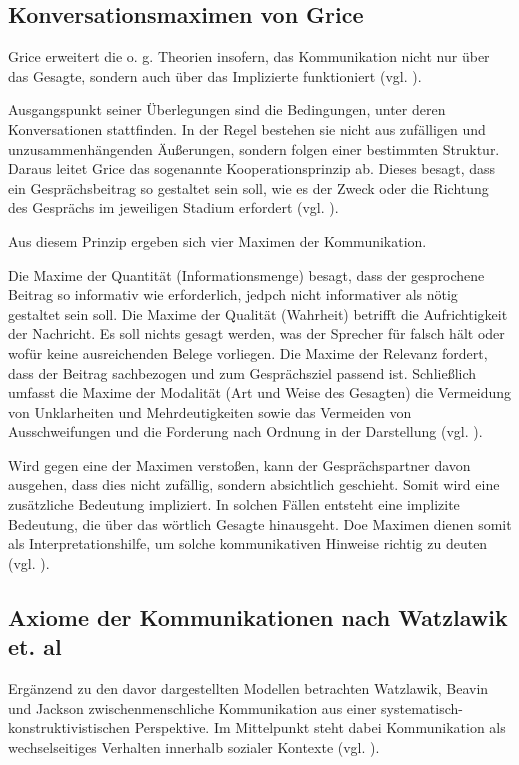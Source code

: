 \subsection{Konversationsmaximen von Grice}
Grice erweitert die o. g. Theorien insofern, das Kommunikation nicht nur über das Gesagte, sondern auch über das Implizierte funktioniert (vgl. \citealp[S. 43f]{grice1975logic}). 

Ausgangspunkt seiner Überlegungen sind die Bedingungen, unter deren Konversationen stattfinden. In der Regel bestehen sie nicht aus zufälligen und unzusammenhängenden Äußerungen, sondern folgen einer bestimmten Struktur. Daraus leitet Grice das sogenannte Kooperationsprinzip ab. Dieses besagt, dass ein Gesprächsbeitrag so gestaltet sein soll, wie es der Zweck oder die Richtung des Gesprächs im jeweiligen Stadium erfordert (vgl. \citealp[S. 45]{grice1975logic}).

Aus diesem Prinzip ergeben sich vier Maximen der Kommunikation. 

Die Maxime der Quantität (Informationsmenge) besagt, dass der gesprochene Beitrag so informativ wie erforderlich, jedpch nicht informativer als nötig gestaltet sein soll. Die Maxime der Qualität (Wahrheit) betrifft die Aufrichtigkeit der Nachricht. Es soll nichts gesagt werden, was der Sprecher für falsch hält oder wofür keine ausreichenden Belege vorliegen. Die Maxime der Relevanz fordert, dass der Beitrag sachbezogen und zum Gesprächsziel passend ist. Schließlich umfasst die Maxime der Modalität (Art und Weise des Gesagten) die Vermeidung von Unklarheiten und Mehrdeutigkeiten sowie das Vermeiden von Ausschweifungen und die Forderung nach Ordnung in der Darstellung (vgl. \citealp[S. 45f]{grice1975logic}).

Wird gegen eine der Maximen verstoßen, kann der Gesprächspartner davon ausgehen, dass dies nicht zufällig, sondern absichtlich geschieht. Somit wird eine zusätzliche Bedeutung impliziert. In solchen Fällen entsteht eine implizite Bedeutung, die über das wörtlich Gesagte hinausgeht. Doe Maximen dienen somit als Interpretationshilfe, um solche kommunikativen Hinweise richtig zu deuten (vgl. \citealp[S. 49f]{grice1975logic}).

\subsection{Axiome der Kommunikationen nach Watzlawik et. al}
Ergänzend zu den davor dargestellten Modellen betrachten Watzlawik, Beavin und Jackson zwischenmenschliche Kommunikation aus einer systematisch-konstruktivistischen Perspektive. Im Mittelpunkt steht dabei Kommunikation als wechselseitiges Verhalten innerhalb sozialer Kontexte (vgl. \citealp{Watzlawick2016-km}). 


